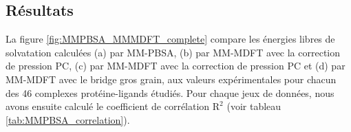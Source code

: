 \begin{center}
    \captionsetup{type=figure}
    \label{fig:structures_MMPBSA}
\end{center}







\subsection{Résultats}

La figure \ref{fig:MMPBSA_MMMDFT_complete} compare les énergies libres de solvatation calculées (a) par MM-PBSA, (b) par MM-MDFT avec la correction de pression PC, (c) par MM-MDFT avec la correction de pression PC et (d) par MM-MDFT avec le bridge gros grain, aux valeurs expérimentales pour chacun des 46 complexes protéine-ligands étudiés. Pour chaque jeux de données, nous avons ensuite calculé le coefficient de corrélation $\mathrm{R}^2$ (voir tableau \ref{tab:MMPBSA_correlation}). 


